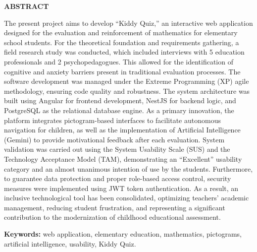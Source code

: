 \begin{center}
    \vspace*{0.5cm}
    {\bfseries ABSTRACT}
\end{center}
\vspace{0.8cm}

\justifying
{}
\noindent
The present project aims to develop ``Kiddy Quiz,'' an interactive web application designed for the evaluation and reinforcement of mathematics for elementary school students. For the theoretical foundation and requirements gathering, a field research study was conducted, which included interviews with 5 education professionals and 2 psychopedagogues. This allowed for the identification of cognitive and anxiety barriers present in traditional evaluation processes. The software development was managed under the Extreme Programming (XP) agile methodology, ensuring code quality and robustness. The system architecture was built using Angular for frontend development, NestJS for backend logic, and PostgreSQL as the relational database engine. As a primary innovation, the platform integrates pictogram-based interfaces to facilitate autonomous navigation for children, as well as the implementation of Artificial Intelligence (Gemini) to provide motivational feedback after each evaluation. System validation was carried out using the System Usability Scale (SUS) and the Technology Acceptance Model (TAM), demonstrating an ``Excellent'' usability category and an almost unanimous intention of use by the students. Furthermore, to guarantee data protection and proper role-based access control, security measures were implemented using JWT token authentication. As a result, an inclusive technological tool has been consolidated, optimizing teachers' academic management, reducing student frustration, and representing a significant contribution to the modernization of childhood educational assessment.

\vspace{0.5cm}

\noindent\textbf{Keywords:} web application, elementary education, mathematics, pictograms, artificial intelligence, usability, Kiddy Quiz.

\newpage
